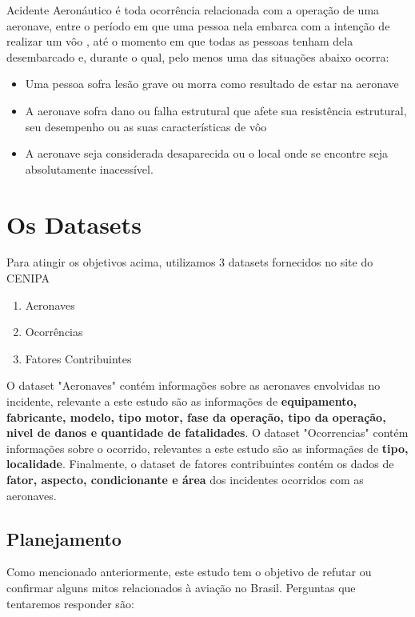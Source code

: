 \documentclass[conference]{IEEEtran}
\begin{document}
Acidente Aeronáutico é toda ocorrência relacionada com a operação de uma aeronave, entre o período em que uma pessoa nela embarca com a intenção de realizar um vôo
, até o momento em que todas as pessoas tenham dela desembarcado e, durante o qual, pelo menos uma das situações abaixo ocorra: \\

\begin{itemize}
 \item Uma pessoa sofra lesão grave ou morra como resultado de estar na aeronave
 \item A aeronave sofra dano ou falha estrutural que afete sua resistência estrutural, seu desempenho ou as suas características de vôo
 \item A aeronave seja considerada desaparecida ou o local onde se encontre seja absolutamente inacessível.
\end{itemize}

\section{Os Datasets}

Para atingir os objetivos acima, utilizamos 3 datasets fornecidos no site do CENIPA

\begin{enumerate}
 \item Aeronaves
 \item Ocorrências
 \item Fatores Contribuintes
\end{enumerate}

O dataset "Aeronaves" contém informações sobre as aeronaves envolvidas no incidente, relevante a este estudo são as informações de \textbf{equipamento, fabricante, modelo, 
tipo motor, fase da operação, tipo da operação, nivel de danos e quantidade de fatalidades}. O dataset "Ocorrencias" contém informações sobre o ocorrido, relevantes a 
este estudo são as informaçães de \textbf{ tipo, localidade}. Finalmente, o dataset de fatores contribuintes contém os dados de \textbf{ fator, aspecto, condicionante e área } 
dos incidentes ocorridos com as aeronaves.

\subsection{Planejamento}

Como mencionado anteriormente, este estudo tem o objetivo de refutar ou confirmar alguns mitos relacionados à aviação no Brasil. Perguntas que tentaremos
responder são: 
\end{document}
